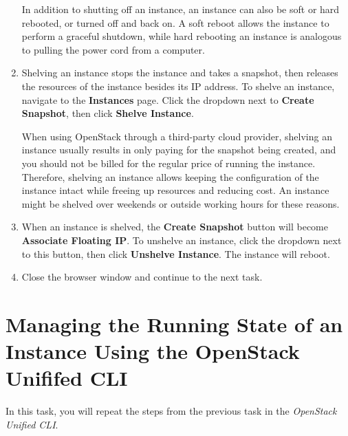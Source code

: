 \documentclass[letterpaper, 12pt]{article}
\begin{document}
\begin{enumerate}
    \begin{tipbox}
        In addition to shutting off an instance, an instance can also be soft or hard rebooted, or turned off and back
        on. A soft reboot allows the instance to perform a graceful shutdown, while hard rebooting an instance is
        analogous to pulling the power cord from a computer.
    \end{tipbox}

    \item Shelving an instance stops the instance and takes a snapshot, then releases the resources of the instance
    besides its IP address. To shelve an instance, navigate to the \textbf{Instances} page. Click the dropdown next to
    \textbf{Create Snapshot}, then click \textbf{Shelve Instance}.

    \begin{tipbox}
        When using OpenStack through a third-party cloud provider, shelving an instance usually results in only paying
        for the snapshot being created, and you should not be billed for the regular price of running the instance.
        Therefore, shelving an instance allows keeping the configuration of the instance intact while freeing up
        resources and reducing cost. An instance might be shelved over weekends or outside working hours for these
        reasons.
    \end{tipbox}

    \item When an instance is shelved, the \textbf{Create Snapshot} button will become \textbf{Associate Floating IP}.
    To unshelve an instance, click the dropdown next to this button, then click \textbf{Unshelve Instance}. The instance
    will reboot.

    \item Close the browser window and continue to the next task.
\end{enumerate}

\section{Managing the Running State of an Instance Using the OpenStack Unififed CLI}
\label{sec:managing_the_power_state_of_an_instance_cli}
In this task, you will repeat the steps from the previous task in the \textit{OpenStack Unified CLI}.
\end{document}
